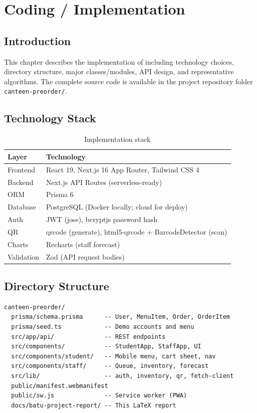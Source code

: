 \chapter{Coding / Implementation}

\section{Introduction}
This chapter describes the implementation of \ShortTitle{} including technology choices, directory structure, major classes/modules, API design, and representative algorithms. The complete source code is available in the project repository folder \texttt{canteen-preorder/}.

\section{Technology Stack}
\begin{table}[H]
  \centering
  \caption{Implementation stack}
  \tablebodysetup
  \begin{tabularx}{\textwidth}{@{}l Y@{}}
    \toprule
    \textbf{Layer} & \textbf{Technology} \\
    \midrule
    Frontend & React 19, Next.js 16 App Router, Tailwind CSS 4 \\
    Backend & Next.js API Routes (serverless-ready) \\
    ORM & Prisma 6 \\
    Database & PostgreSQL (Docker locally; cloud for deploy) \\
    Auth & JWT (jose), bcryptjs password hash \\
    QR & qrcode (generate), html5-qrcode + BarcodeDetector (scan) \\
    Charts & Recharts (staff forecast) \\
    Validation & Zod (API request bodies) \\
    \bottomrule
  \end{tabularx}
\end{table}

\section{Directory Structure}
\begin{lstlisting}[caption={Project layout (abbreviated)}]
canteen-preorder/
  prisma/schema.prisma      -- User, MenuItem, Order, OrderItem
  prisma/seed.ts            -- Demo accounts and menu
  src/app/api/              -- REST endpoints
  src/components/           -- StudentApp, StaffApp, UI
  src/components/student/   -- Mobile menu, cart sheet, nav
  src/components/staff/     -- Queue, inventory, forecast
  src/lib/                  -- auth, inventory, qr, fetch-client
  public/manifest.webmanifest
  public/sw.js              -- Service worker (PWA)
  docs/batu-project-report/ -- This LaTeX report
\end{lstlisting}

